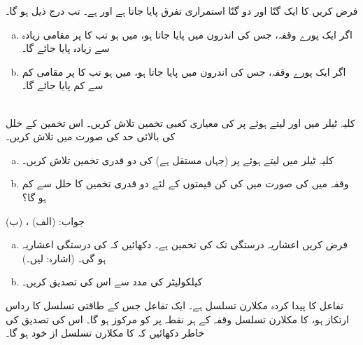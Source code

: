 فرض کریں  کا  ایک گنّا اور دو گنّا استمراری تفرق پایا جاتا ہے اور  ہے۔ تب درج ذیل ہو گا۔
\begin{enumerate}[a.]
\item
اگر ایک پورے  وقفہ، جس کی اندرون میں  پایا جاتا ہو، میں  ہو تب  کا  پر مقامی زیادہ سے زیادہ پایا جائے گا۔
\item
اگر ایک  پورے وقفہ، جس کی اندرون میں  پایا جاتا ہو، میں  ہو تب  کا  پر مقامی کم سے کم پایا جائے گا۔
\end{enumerate}
\\
کلیہ ٹیلر میں  اور  لیتے ہوئے  پر  کی معیاری کعبی تخمین تلاش کریں۔ اس تخمین کے خلل کی بالائی حد  کی صورت میں تلاش کریں۔
\begin{enumerate}[a.]
\item
کلیہ ٹیلر میں  لیتے ہوئے  پر   (جہاں  مستقل ہے) کی دو قدری تخمین تلاش کریں۔
\item
وقفہ  میں  کی صورت میں  کی کن قیمتوں کے لئے دو قدری تخمین کا خلل  سے کم ہو گا؟ 
\end{enumerate}
جواب:\quad
(الف) ، (ب) 
\\
\begin{enumerate}[a.]
\item
فرض کریں  اعشاریہ درستگی تک  کی تخمین  ہے۔ دکھائیں کہ  کی درستگی  اعشاریہ ہو گی۔ (اشارہ:  لیں۔)
\item
کیلکولیٹر کی مدد سے اس کی تصدیق کریں۔
\end{enumerate}
تفاعل  کا پیدا کردہ مکلارن تسلسل  ہے۔ ایک تفاعل جس کے طاقتی تسلسل  کا رداس ارتکاز  ہو، کا مکلارن تسلسل وقفہ  کے ہر نقطہ پر  کو مرکوز ہو گا۔ اس کی تصدیق کی خاطر دکھائیں کہ  کا مکلارن تسلسل از خود  ہو گا۔ 

